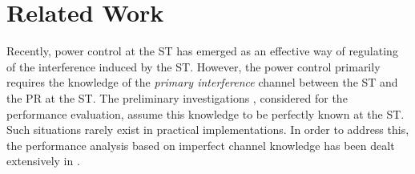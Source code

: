 
\section{Related Work}
 Recently, power control at the ST has emerged as an effective way of regulating of the interference induced by the ST. However, the power control primarily requires the knowledge of the \textit{primary interference} channel between the ST and the PR at the ST. The preliminary investigations \cite{Xing07, Ghasemi07, Sura08, Musa09_, Kang09}, considered for the performance evaluation, assume this knowledge to be perfectly known at the ST. Such situations rarely exist in practical implementations. In order to address this, the performance analysis based on imperfect channel knowledge has been dealt extensively in \cite{Musa09, Suraweera10, Kim12, Alou12, Stat12, Alou13, Zhang13, Smith13, Li13, Kerr14, Sharma15}.

